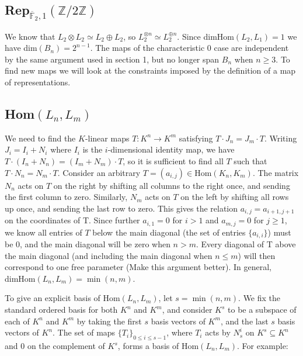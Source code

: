 \documentclass[11pt]{article} %
\begin{document}
\iffalse


\subsection{Rep$_{\overline{\mathbb{F}}_2,1}(\mathbb{Z}/2\mathbb{Z})$}
We know that $L_2 \otimes L_2 \simeq L_2 \oplus L_2$, so $L_2^{\otimes n} \simeq L_2^{\oplus n}$. Since dimHom$(L_2,L_1)=1$ we have dim$(B_n) = 2^{n-1}$. The maps of the characteristic $0$ case are independent by the same argument used in section 1, but no longer span $B_n$ when $n \geq 3$. To find new maps we will look at the constraints imposed by the definition of a map of representations. 

\subsection{Hom$(L_n,L_m)$}
We need to find the $K$-linear maps $T:K^n \rightarrow K^m$ satisfying $T \cdot J_n = J_m \cdot T$. Writing $J_i = I_i + N_i$ where $I_i$ is the $i$-dimensional identity map, we have $T \cdot (I_n + N_n) = (I_m + N_m) \cdot T$, so it is sufficient to find all $T$ such that $T \cdot N_n = N_m \cdot T$. Consider an arbitrary $T=\left(a_{i,j}\right) \in \text{Hom}(K_n,K_m)$. The matrix $N_n$ acts on $T$ on the right by shifting all columns to the right once, and sending the first column to zero. Similarly, $N_m$ acts on $T$ on the left by shifting all rows up once, and sending the last row to zero. This gives the relation $a_{i,j} = a_{i+1,j+1}$ on the coordinates of T. Since further $a_{i,1}=0$ for $i > 1$ and $a_{m,j} = 0$ for $j \geq 1$, we know all entries of $T$ below the main diagonal (the set of entries $\{a_{i,i}\}$) must be $0$, and the main diagonal will be zero when $n > m$. Every diagonal of T above the main diagonal (and including the main diagonal when $n \leq m$) will then correspond to one free parameter (Make this argument better). In general, dimHom$(L_n,L_m)=\min(n,m)$.

To give an explicit basis of Hom$(L_n,L_m)$, let $s = \min(n,m)$. We fix the standard ordered basis for both $K^n$ and $K^m$, and consider $K^s$ to be a subspace of each of $K^n$ and $K^m$ by taking the first $s$ basis vectors of $K^m$, and the last $s$ basis vectors of $K^n$. The set of maps $\{T_i\}_{0 \leq i \leq s-1}$, where $T_i$ acts by $N_s^i$ on $K^s \subseteq K^n$ and $0$ on the complement of $K^s$, forms a basis of Hom$(L_n,L_m)$. For example: 
\end{document}
